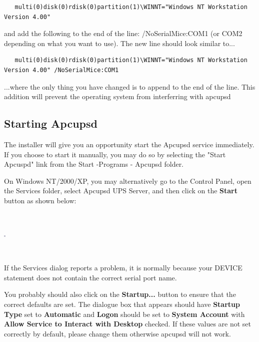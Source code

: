{{{{{{{\begin{verbatim}
   multi(0)disk(0)rdisk(0)partition(1)\WINNT="Windows NT Workstation Version 4.00"
\end{verbatim}

and add the following to the end of the line: /NoSerialMice:COM1 (or COM2
depending on what you want to use). The new line should look similar to...

\begin{verbatim}
   multi(0)disk(0)rdisk(0)partition(1)\WINNT="Windows NT Workstation Version 4.00" /NoSerialMice:COM1  
\end{verbatim}

...where the only thing you have changed is to append to the end of the line.
This addition will prevent the operating system from interferring with apcupsd


\label{Starting Apcupsd}
\subsection*{Starting Apcupsd}

The installer will give you an opportunity start the Apcupsd service
immediately. If you choose to start it manually, you may do so by selecting
the "Start Apcuspd" link from the Start -\gt{}Programs -\gt{} Apcupsd folder.

On Windows NT/2000/XP, you may alternatively go to the Control Panel, open
the Services folder, select Apcupsd UPS Server, and then click on the
{\bf Start} button as shown below:

\footnotesize
\begin{verbatim}
     
\end{verbatim}
\normalsize

\includegraphics{./wininstall6.eps}  

\footnotesize
\begin{verbatim}
     
\end{verbatim}
\normalsize

If the Services dialog reports a problem, it is normally because your DEVICE
statement does not contain the correct serial port name. 

You probably should also click on the {\bf Startup...} button to ensure that
the correct defaults are set. The dialogue box that appears should have {\bf
Startup Type} set to {\bf Automatic} and {\bf Logon} should be set to {\bf
System Account} with {\bf Allow Service to Interact with Desktop} checked. If
these values are not set correctly by default, please change them otherwise
apcupsd will not work.  

}}}}}}}
